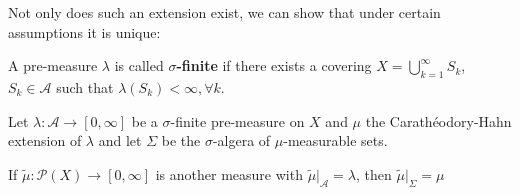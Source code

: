 Not only does such an extension exist, we can show that under certain assumptions it is unique:


\begin{dfn}[]
A pre-measure $\lambda$ is called \textbf{$\sigma$-finite} if there exists a covering $X = \bigcup_{k=1}^{\infty}S_k$, $S_k \in \mathcal{A}$ such that $\lambda(S_k) < \infty, \forall k$.
\end{dfn}


\begin{thm}
  Let $\lambda: \mathcal{A} \to  [0,\infty]$ be a $\sigma$-finite pre-measure on $X$ and $\mu$ the Carathéodory-Hahn extension of $\lambda$ and let $\Sigma$ be the $\sigma$-algera of $\mu$-measurable sets.

  If $\tilde{\mu}: \mathcal{P}(X) \to [0,\infty]$ is another measure with $\tilde{\mu}|_{\mathcal{A}} = \lambda$, then $\tilde{\mu}|_{\Sigma} = \mu$
\end{thm}
